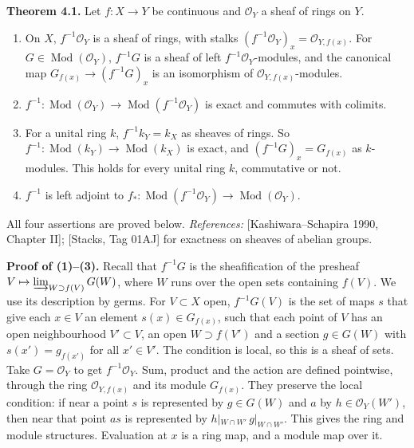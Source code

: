 \documentclass[
  english,
  11pt,
  a4paper,
]{article}
\providecommand{\tightlist}{%
  \setlength{\itemsep}{0pt}\setlength{\parskip}{0pt}}
\begin{document}
\textbf{Theorem 4.1.} Let \(f:X\to Y\) be continuous and
\(\mathcal O_Y\) a sheaf of rings on \(Y\).

\begin{enumerate}
\tightlist
\item
  On \(X\), \(f^{-1}\mathcal O_Y\) is a sheaf of rings, with stalks
  \((f^{-1}\mathcal O_Y)_x=\mathcal O_{Y,f(x)}\). For
  \(G\in\operatorname{Mod}(\mathcal O_Y)\), \(f^{-1}G\) is a sheaf of
  left \(f^{-1}\mathcal O_Y\)-modules, and the canonical map
  \(G_{f(x)}\to(f^{-1}G)_x\) is an isomorphism of
  \(\mathcal O_{Y,f(x)}\)-modules.
\item
  \(f^{-1}:\operatorname{Mod}(\mathcal O_Y)\to\operatorname{Mod}(f^{-1}\mathcal O_Y)\)
  is exact and commutes with colimits.
\item
  For a unital ring \(k\), \(f^{-1}k_Y=k_X\) as sheaves of rings. So
  \(f^{-1}:\operatorname{Mod}(k_Y)\to\operatorname{Mod}(k_X)\) is exact,
  and \((f^{-1}G)_x=G_{f(x)}\) as \(k\)-modules. This holds for every
  unital ring \(k\), commutative or not.
\item
  \(f^{-1}\) is left adjoint to
  \(f_*:\operatorname{Mod}(f^{-1}\mathcal O_Y)\to\operatorname{Mod}(\mathcal O_Y)\).
\end{enumerate}

All four assertions are proved below. \emph{References:}
{[}Kashiwara--Schapira 1990, Chapter II{]}; {[}Stacks, Tag 01AJ{]} for
exactness on sheaves of abelian groups.

\textbf{Proof of (1)--(3).} Recall that \(f^{-1}G\) is the
sheafification of the presheaf
\(V\mapsto\varinjlim_{W\supset f(V)}G(W)\), where \(W\) runs over the
open sets containing \(f(V)\). We use its description by germs. For
\(V\subset X\) open, \(f^{-1}G(V)\) is the set of maps \(s\) that give
each \(x\in V\) an element \(s(x)\in G_{f(x)}\), such that each point of
\(V\) has an open neighbourhood \(V'\subset V\), an open
\(W\supset f(V')\) and a section \(g\in G(W)\) with \(s(x')=g_{f(x')}\)
for all \(x'\in V'\). The condition is local, so this is a sheaf of
sets. Take \(G=\mathcal O_Y\) to get \(f^{-1}\mathcal O_Y\). Sum,
product and the action are defined pointwise, through the ring
\(\mathcal O_{Y,f(x)}\) and its module \(G_{f(x)}\). They preserve the
local condition: if near a point \(s\) is represented by \(g\in G(W)\)
and \(a\) by \(h\in\mathcal O_Y(W')\), then near that point \(as\) is
represented by \(h|_{W\cap W'}\,g|_{W\cap W'}\). This gives the ring and
module structures. Evaluation at \(x\) is a ring map, and a module map
over it.
\end{document}
